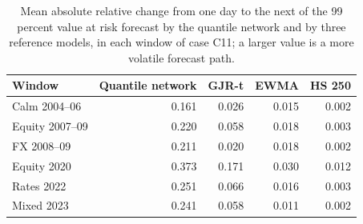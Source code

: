 \begin{table}[htbp]
\centering
\footnotesize
\setlength{\tabcolsep}{4.0pt}
\caption{Mean absolute relative change from one day to the next of the 99 percent value at risk forecast by the quantile network and by three reference models, in each window of case C11; a larger value is a more volatile forecast path.}
\label{tab:market-rough}
\begin{tabular}{lrrrr}
\toprule
Window & Quantile network & GJR-t & EWMA & HS 250 \\
\midrule
Calm 2004--06 & 0.161 & 0.026 & 0.015 & 0.002 \\
Equity 2007--09 & 0.220 & 0.058 & 0.018 & 0.003 \\
FX 2008--09 & 0.211 & 0.020 & 0.018 & 0.002 \\
Equity 2020 & 0.373 & 0.171 & 0.030 & 0.012 \\
Rates 2022 & 0.251 & 0.066 & 0.016 & 0.003 \\
Mixed 2023 & 0.241 & 0.058 & 0.011 & 0.002 \\
\bottomrule
\end{tabular}
\end{table}
